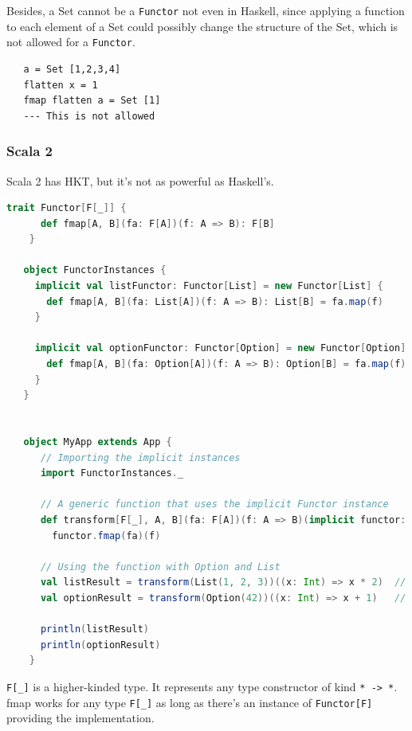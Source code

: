 Besides, a Set cannot be a \lstinline|Functor| not even in Haskell, since applying a function to each element of a Set could possibly change the structure of the Set, which is not allowed for a \lstinline|Functor|.
\begin{lstlisting}
   a = Set [1,2,3,4]
   flatten x = 1
   fmap flatten a = Set [1]
   --- This is not allowed
\end{lstlisting}

\subsubsection{Scala 2}
Scala 2 has HKT, but it's not as powerful as Haskell's.
\begin{lstlisting}[language=Scala]
   trait Functor[F[_]] {
      def fmap[A, B](fa: F[A])(f: A => B): F[B]
    }
    
   object FunctorInstances {
     implicit val listFunctor: Functor[List] = new Functor[List] {
       def fmap[A, B](fa: List[A])(f: A => B): List[B] = fa.map(f)
     }
   
     implicit val optionFunctor: Functor[Option] = new Functor[Option] {
       def fmap[A, B](fa: Option[A])(f: A => B): Option[B] = fa.map(f)
     }
   }
    

   object MyApp extends App {
      // Importing the implicit instances
      import FunctorInstances._
    
      // A generic function that uses the implicit Functor instance
      def transform[F[_], A, B](fa: F[A])(f: A => B)(implicit functor: Functor[F]): F[B] =
        functor.fmap(fa)(f)
    
      // Using the function with Option and List
      val listResult = transform(List(1, 2, 3))((x: Int) => x * 2)  // List(2, 4, 6)
      val optionResult = transform(Option(42))((x: Int) => x + 1)   // Some(43)
    
      println(listResult)
      println(optionResult)
    } 
\end{lstlisting}

\lstinline|F[_]| is a higher-kinded type. It represents any type constructor of kind \lstinline|* -> *|.
fmap works for any type \lstinline|F[_]| as long as there's an instance of \lstinline|Functor[F]| providing the implementation.


